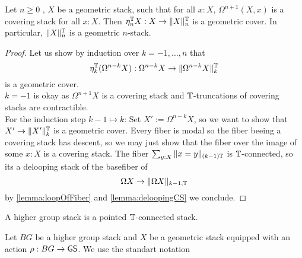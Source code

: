 \begin{prop}{\label{prop:LoopingsImplyGerbe}}
	Let $n \ge 0$ , $X$ be a geometric stack, such that for all $x : X$, $\Omega^{n+1} (X , x)$ is a covering stack for all $x : X$. Then $\eta_n^{\mathbb{T}} X : X \to \|X\|_n^{\mathbb{T}}$ is a geometric cover. In particular, $\|X\|_n^{\mathbb{T}}$ is a geometric $n$-stack.
\end{prop}
\begin{proof}
	Let us show by induction over $k = -1,\hdots,n$ that 
	\[\eta_k^{\mathbb{T}} (\Omega^{n - k} X) : \Omega^{n - k} X \to \|\Omega^{n - k} X\|_k^{\mathbb{T}}\]
	is a geometric cover.  \\
	$k=-1$ is okay as $\Omega^{n+1} X$ is a covering stack and $\mathbb{T}$-truncations of covering stacks are contractible. \\
	For the induction step $k - 1 \mapsto k$:
	Set $X' := \Omega^{n-k} X$, so we want to show that $X' \to \|X'\|_k^{\mathbb{T}}$ is a geometric cover.
	Every fiber is modal so the fiber beeing a covering stack has descent, so we may just show that the fiber over the image of some $x : X$ is a covering stack. The fiber $\sum_{y : X} \| x = y\|_{(k-1)\mathbb{T}}$ is $\mathbb{T}$-connected, so its a delooping stack of the basefiber of 
	\[
	\Omega X  \to \|\Omega X \|_{k-1, \mathbb{T}}
	\]
	by \ref{lemma:loopOfFiber} and \ref{lemma:deloopingCS} we conclude.
\end{proof}


\begin{definition}
	A higher group stack is a pointed $\mathbb{T}$-connected stack.
\end{definition}
Let $BG$ be a higher group stack and $X$ be a geometric stack equipped with an action $\rho : BG \to \mathsf{GS}$. We use the standart notation

